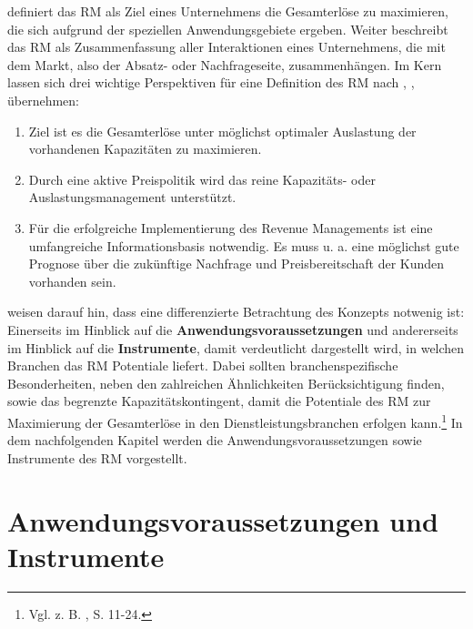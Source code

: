 \cite{Petrick:2009aa} definiert das RM als Ziel eines Unternehmens die Gesamterlöse zu maximieren, die sich aufgrund der speziellen Anwendungsgebiete ergeben. Weiter beschreibt \cite{Petrick:2009aa} das RM als Zusammenfassung aller Interaktionen eines Unternehmens, die mit dem Markt, also der Absatz- oder Nachfrageseite, zusammenhängen. Im Kern lassen sich drei wichtige Perspektiven für eine Definition des RM nach \cite{Petrick:2009aa}, \cite{stuhlmann2000kapazitatsgestaltung},  \cite{corsten1999yield} übernehmen:
\begin{enumerate}
	\item Ziel ist es die Gesamterlöse unter möglichst optimaler Auslastung der vorhandenen Kapazitäten zu maximieren.
	\item Durch eine aktive Preispolitik wird das reine Kapazitäts- oder Auslastungsmanagement unterstützt.
	\item Für die erfolgreiche Implementierung des Revenue Managements ist eine umfangreiche Informationsbasis notwendig. Es muss u. a. eine möglichst gute Prognose über die zukünftige Nachfrage und Preisbereitschaft der Kunden vorhanden sein.
\end{enumerate}

\cite{kimms2005revenue} weisen darauf hin, dass eine differenzierte Betrachtung des Konzepts notwenig ist: Einerseits im Hinblick auf die \textbf{Anwendungsvoraussetzungen} und andererseits im Hinblick auf die \textbf{Instrumente}, damit verdeutlicht dargestellt wird, in welchen Branchen das RM Potentiale liefert. Dabei sollten branchenspezifische Besonderheiten, neben den zahlreichen Ähnlichkeiten Berücksichtigung finden, sowie das begrenzte Kapazitätskontingent, damit die Potentiale des RM zur Maximierung der Gesamterlöse in den Dienstleistungsbranchen erfolgen kann.\footnote{Vgl. z. B. \cite{Martens:2009aa}, S. 11-24.} In dem nachfolgenden Kapitel werden die Anwendungsvoraussetzungen sowie Instrumente des RM vorgestellt.

\section{Anwendungsvoraussetzungen und Instrumente}

